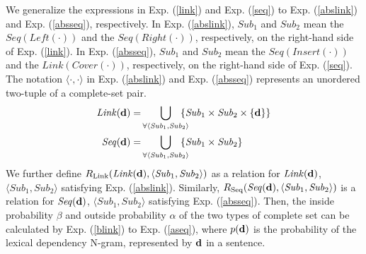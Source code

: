 \documentclass[english]{jnlp_1.4}
\begin{document}
We generalize the expressions in Exp. (\ref{link}) and Exp. (\ref{seq}) to Exp. (\ref{abslink}) and Exp. (\ref{absseq}), respectively. In Exp. (\ref{abslink}), $\mathit{Sub_1}$ and $\mathit{Sub_2}$ mean the $\mathit{Seq (Left(\cdot))}$ and the $\mathit{Seq (Right(\cdot))}$, respectively, on the right-hand side of Exp. (\ref{link}).
In Exp. (\ref{absseq}), $\mathit{Sub_1}$ and $\mathit{Sub_2}$ mean the $\mathit{Seq (Insert(\cdot))}$ and the $\mathit{Link(Cover(\cdot))}$, respectively, on the right-hand side of Exp. (\ref{seq}).  
The notation $\langle \cdot, \cdot \rangle$ in Exp. (\ref{abslink}) and Exp. (\ref{absseq}) represents an unordered two-tuple of a complete-set pair.
\pagebreak
\begin{align}
\label{abslink}
\mathit{Link} ({\bf{d}}) = &\bigcup_{\forall \langle \mathit{Sub}_1, \mathit{Sub}_2 \rangle} 
\hspace{-3mm} \{ \mathit{Sub}_1 \times \mathit{Sub}_2 \times \{ {\bf{d}\} } \} \\
\label{absseq}
\mathit{Seq} ({\bf{d}}) = &\bigcup_{\forall \langle \mathit{Sub}_1, \mathit{Sub}_2 \rangle} 
\hspace{-3mm} \{ \mathit{Sub}_1 \times \mathit{Sub}_2 \}
\end{align}
We further define
$R_{\mathrm{Link}} (\mathit{Link} ({\bf{d}}), \langle \mathit{Sub}_1, \mathit{Sub}_2 \rangle)$
as a relation for $\mathit{Link} ({\bf{d}})$, $\langle \mathit{Sub}_1, \mathit{Sub}_2 \rangle$ satisfying Exp. (\ref{abslink}). Similarly,
$R_{\mathrm{Seq}} (\mathit{Seq} ({\bf{d}}), \langle \mathit{Sub}_1, \mathit{Sub}_2 \rangle)$
is a relation for $\mathit{Seq} ({\bf{d}})$, $\langle \mathit{Sub}_1, \mathit{Sub}_2 \rangle$ satisfying Exp. (\ref{absseq}).
Then, the inside probability $\beta$ and outside probability $\alpha$ of the two types of complete set can be calculated by Exp. (\ref{blink}) to Exp. (\ref{aseq}), where $p ({\bf{d}})$ is the probability of the lexical dependency N-gram, represented by ${\bf{d}}$ in a sentence.
\end{document}

